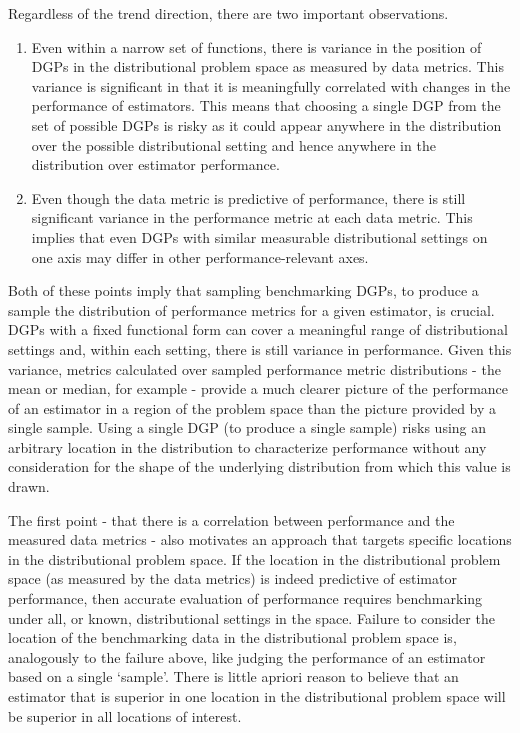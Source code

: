 \documentclass[../main.tex]{subfiles}
\begin{document}
Regardless of the trend direction, there are two important observations.

\begin{enumerate}
    \item Even within a narrow set of functions, there is variance in the position of DGPs in the distributional problem space as measured by data metrics. This variance is significant in that it is meaningfully correlated with changes in the performance of estimators. This means that choosing a single DGP from the set of possible DGPs is risky as it could appear anywhere in the distribution over the possible distributional setting and hence anywhere in the distribution over estimator performance.
    
    \item Even though the data metric is predictive of performance, there is still significant variance in the performance metric at each data metric. This implies that even DGPs with similar measurable distributional settings on one axis may differ in other performance-relevant axes.
\end{enumerate}

Both of these points imply that sampling benchmarking DGPs, to produce a sample the distribution of performance metrics for a given estimator, is crucial. DGPs with a fixed functional form can cover a meaningful range of distributional settings and, within each setting, there is still variance in performance. Given this variance, metrics calculated over sampled performance metric distributions - the mean or median, for example - provide a much clearer picture of the performance of an estimator in a region of the problem space than the picture provided by a single sample. Using a single DGP (to produce a single sample) risks using an arbitrary location in the distribution to characterize performance without any consideration for the shape of the underlying distribution from which this value is drawn.

\vspace{\baselineskip}

The first point - that there is a correlation between performance and the measured data metrics - also motivates an approach that targets specific locations in the distributional problem space. If the location in the distributional problem space (as measured by the data metrics) is indeed predictive of estimator performance, then accurate evaluation of performance requires benchmarking under all, or known, distributional settings in the space. Failure to consider the location of the benchmarking data in the distributional problem space is, analogously to the failure above, like judging the performance of an estimator based on a single `sample'. There is little apriori reason to believe that an estimator that is superior in one location in the distributional problem space will be superior in all locations of interest.
\end{document}
